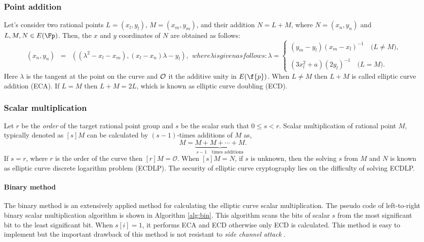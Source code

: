 \subsubsection{Point addition}
Let's consider two rational points $L = (x_l, y_l)$, $M = (x_m, y_m)$, and their addition $N = L + M$, where $\textit{N} = (x_n, y_n)$ and $L, M, N\in E(\Fp)$. Then, the $x$ and $y$ coordinates of $N$ are obtained as follows:
\begin{subequations}
	\begin{eqnarray}\label{eq:point_add}
	(x_n ,y_n) & = & ((\lambda^2-x_l-x_m ),  (x_l-x_n)\lambda - y_l), 
	\end{eqnarray}
	where \mbox{$\lambda$} is given as follows:
	\begin{equation}\label{eq:point_solpe}
	\textstyle \lambda = 
	\begin{cases}
	\textstyle (y_m - y_l)(x_m -x_l)^{-1} \quad \mbox{($L \neq M$)},\\\\
	\textstyle  (3x_l^2+a)(2y_l)^{-1} \quad  \mbox{($L = M$)}.
	\end{cases}
	\end{equation}
\end{subequations}
Here $\lambda$ is the tangent at the point on the curve and $\cal O$ it the additive unity in $E(\f{p})$. When $L \neq M$ then $L+M$ is called elliptic curve addition (ECA). If $L=M$ then $L+M=2L$, which is known as elliptic curve doubling (ECD). 
\subsubsection{Scalar multiplication}
Let $r$ be the \textit{order} of the target rational point group and $s$ be the scalar such that $0 \leq s < r$. Scalar multiplication of rational point $M$, typically denoted as $[s]M$ can be calculated by $(s-1)$-times additions of $M$ as,
\begin{equation}
[s]M = \underbrace{M+M+ \cdots +M}_{s-1 \quad \mbox{times additions}}.
\end{equation}
If $s = r$, where $r$ is the order of the curve then $[r]M = \mathcal{O}$. When $[s]M = N$, if $s$ is unknown, then the solving $s$ from $M$ and $N$ is known as elliptic curve discrete logarithm problem (ECDLP). The security of elliptic curve cryptography lies on the difficulty of solving ECDLP.

\paragraph{Binary method}
The binary method is an extensively applied method for calculating the elliptic curve scalar multiplication.  The pseudo code of left-to-right binary scalar multiplication algorithm is shown in Algorithm \ref{alg:bin}. This algorithm scans the bits of scalar $s$ from the  most significant bit to the least significant bit. When $s[i] = 1$, it  performs ECA and ECD otherwise only ECD is calculated.  This method is easy to implement but the important drawback of this method is not resistant to \textit{side channel attack} \cite{C:Kocher96}.  

